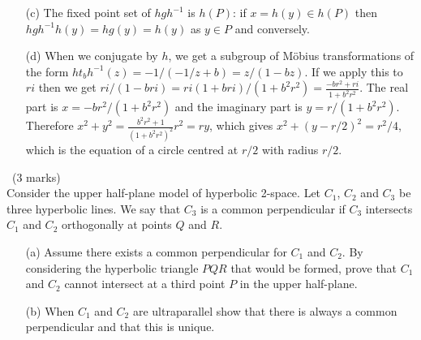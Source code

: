 \documentclass[12pt]{article}
\begin{document}
\begin{answer}
\begin{enumerate}
  \item[(c)] The fixed point set of $hgh^{-1}$ is $h(P)$: if $x=h(y)\in h(P)$ then $hgh^{-1}h(y)=hg(y)=h(y)$ as $y\in P$ and conversely.
  \item[(d)] When we conjugate by $h$, we get a subgroup of M\"obius transformations of the form $ht_bh^{-1}(z)=-1/(-1/z+b)=z/(1-bz)$. If we apply this to $ri$ then we get $ri/(1-bri)=ri(1+bri)/(1+b^2r^2)=\frac{-br^2+ri}{1+b^2r^2}$. The real part is $x=-br^2/(1+b^2r^2)$ and the imaginary part is $y=r/(1+b^2r^2)$. Therefore $x^2+y^2=\frac{b^2r^2+1}{(1+b^2r^2)^2}r^2=ry$, which gives $x^2+(y-r/2)^2=r^2/4$, which is the equation of a circle centred at $r/2$ with radius $r/2$.
  \end{enumerate}
\end{answer}
\fi

\newpage

\begin{question}\ (3 marks)\\
  Consider the upper half-plane model of hyperbolic 2-space. Let $C_1$, $C_2$ and $C_3$ be three hyperbolic lines. We say that $C_3$ is a common perpendicular if $C_3$ intersects $C_1$ and $C_2$ orthogonally at points $Q$ and $R$.
  \begin{enumerate}
  \item[(a)] Assume there exists a common perpendicular for $C_1$ and $C_2$. By considering the hyperbolic triangle $PQR$ that would be formed, prove that $C_1$ and $C_2$ cannot intersect at a third point $P$ in the upper half-plane.
  \item[(b)] When $C_1$ and $C_2$ are ultraparallel show that there is always a common perpendicular and that this is unique.
  \end{enumerate}
\end{question}
\iffalse
\begin{answer}
  \begin{enumerate}
  \item[(a)] The triangle $PQR$ would have internal angles $\pi/2,\pi/2,\epsilon$ for some $\epsilon>0$ and these sum to $\pi+\epsilon>\pi$ which contradicts the Gauss-Bonnet theorem.
  \item[(b)] WLOG take $C_1$ to be the imaginary axis. Then $C_3$ must be a semicircle centred at $0$. There is a 1-parameter family of such semicircles, an interval of which intersect $C_2$. At one end of this interval, the angle of intersection between $C_3$ and $C_2$ is zero (when they are first tangent), then it starts to increase, until it reaches $\pi$ (when they are last tangent). Since this angle depends continuously on the radius of $C_3$, it takes on every value between $0$ and $\pi$ (by the intermediate value theorem). Therefore there exists such a $C_3$. If there were two, they (along with $C_1$ and $C_2$) would form a hyperbolic quadrilateral with all internal angles equal to $\pi/2$, which would contradict Gauss-Bonnet.
  \end{enumerate}
\end{answer}
\newpage
\fi
\end{document}
